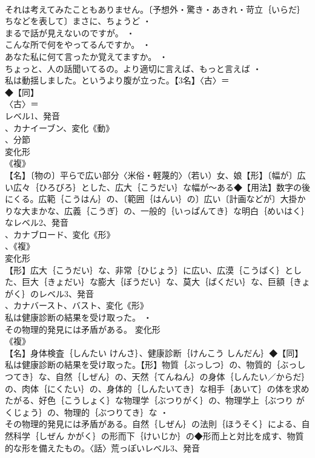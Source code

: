 \documentclass[8pt]{extreport}
\begin{document}
\begin{CJK}{UTF8}{min}
\\	それは考えてみたこともありません。〔予想外・驚き・あきれ・苛立｛いらだ｝ちなどを表して〕まさに、ちょうど ・
\\	まるで話が見えないのですが。 ・
\\	こんな所で何をやってるんですか。 ・
\\	あなた私に何て言ったか覚えてますか。 ・
\\	ちょっと、人の話聞いてるの。より適切に言えば、もっと言えば ・
\\	私は動揺しました。というより腹が立った。【3名】〈古〉＝
\\	◆【同】
\\	〈古〉＝
\\	レベル1、発音
\\	、カナイーブン、変化《動》
\\	、分節
\\	変化形 
\\	《複》
\\	【名】〔物の〕平らで広い部分〈米俗・軽蔑的〉（若い）女、娘【形】〔幅が〕広い広々｛ひろびろ｝とした、広大｛こうだい｝な幅が～ある◆【用法】数字の後にくる。広範｛こうはん｝の、〔範囲｛はんい｝の〕広い〔計画などが〕大掛かりな大まかな、広義｛こうぎ｝の、一般的｛いっぱんてき｝な明白｛めいはく｝なレベル2、発音
\\	、カナブロード、変化《形》
\\	、《複》
\\	変化形 
\\	【形】広大｛こうだい｝な、非常｛ひじょう｝に広い、広漠｛こうばく｝とした、巨大｛きょだい｝な膨大｛ぼうだい｝な、莫大｛ばくだい｝な、巨額｛きょがく｝のレベル3、発音
\\	、カナバースト、バスト、変化《形》
\\	私は健康診断の結果を受け取った。 ・
\\	その物理的発見には矛盾がある。	変化形 
\\	《複》
\\	【名】身体検査｛しんたい けんさ｝、健康診断｛けんこう しんだん｝◆【同】
\\	私は健康診断の結果を受け取った。【形】物質｛ぶっしつ｝の、物質的｛ぶっしつてき｝な、自然｛しぜん｝の、天然｛てんねん｝の身体｛しんたい／からだ｝の、肉体｛にくたい｝の、身体的｛しんたいてき｝な相手｛あいて｝の体を求めたがる、好色｛こうしょく｝な物理学｛ぶつりがく｝の、物理学上｛ぶつり がくじょう｝の、物理的｛ぶつりてき｝な ・
\\	その物理的発見には矛盾がある。自然｛しぜん｝の法則｛ほうそく｝による、自然科学｛しぜん かがく｝の形而下｛けいじか｝の◆形而上と対比を成す、物質的な形を備えたもの。〈話〉荒っぽいレベル3、発音

\end{CJK}
\end{document}
